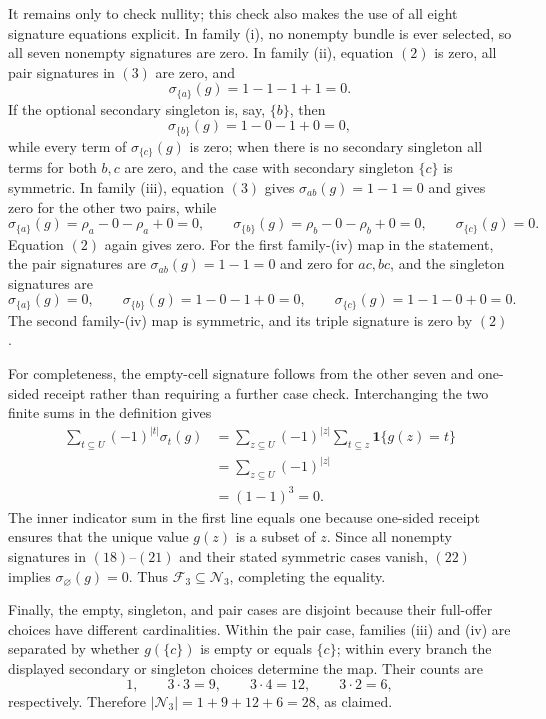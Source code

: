 It remains only to check nullity; this check also makes the use of all
eight signature equations explicit.  In family (i), no nonempty
bundle is ever selected, so all seven nonempty signatures are zero.
In family (ii), equation \((2)\) is zero, all pair signatures in
\((3)\) are zero, and
\[
\sigma_{\{a\}}(g)=1-1-1+1=0. \tag{18}
\]
If the optional secondary singleton is, say, \(\{b\}\), then
\[
\sigma_{\{b\}}(g)=1-0-1+0=0, \tag{19}
\]
while every term of \(\sigma_{\{c\}}(g)\) is zero; when there is no
secondary singleton all terms for both \(b,c\) are zero, and the
case with secondary singleton \(\{c\}\) is symmetric.  In family
(iii), equation \((3)\) gives
\(\sigma_{ab}(g)=1-1=0\) and gives zero for the other two pairs,
while
\[
\sigma_{\{a\}}(g)=\rho_a-0-\rho_a+0=0,
\qquad
\sigma_{\{b\}}(g)=\rho_b-0-\rho_b+0=0,
\qquad
\sigma_{\{c\}}(g)=0. \tag{20}
\]
Equation \((2)\) again gives zero.  For the first family-(iv) map in
the statement, the pair signatures are
\(\sigma_{ab}(g)=1-1=0\) and zero for \(ac,bc\), and the singleton
signatures are
\[
\sigma_{\{a\}}(g)=0,
\qquad
\sigma_{\{b\}}(g)=1-0-1+0=0,
\qquad
\sigma_{\{c\}}(g)=1-1-0+0=0. \tag{21}
\]
The second family-(iv) map is symmetric, and its triple signature is
zero by \((2)\).

For completeness, the empty-cell signature follows from the other
seven and one-sided receipt rather than requiring a further case
check.  Interchanging the two finite sums in the definition gives
\[
\begin{aligned}
\sum_{t\subseteq U}(-1)^{|t|}\sigma_t(g)
&=\sum_{z\subseteq U}(-1)^{|z|}
  \sum_{t\subseteq z}\mathbf 1\{g(z)=t\}\\
&=\sum_{z\subseteq U}(-1)^{|z|}\\
&=(1-1)^3=0.
\end{aligned} \tag{22}
\]
The inner indicator sum in the first line equals one because
one-sided receipt ensures that the unique value \(g(z)\) is a subset
of \(z\).  Since all nonempty signatures in
\((18)\)--\((21)\) and their stated symmetric cases vanish,
\((22)\) implies \(\sigma_\varnothing(g)=0\).  Thus
\(\mathcal F_3\subseteq\mathcal N_3\), completing the equality.

Finally, the empty, singleton, and pair cases are disjoint because
their full-offer choices have different cardinalities.  Within the
pair case, families (iii) and (iv) are separated by whether
\(g(\{c\})\) is empty or equals \(\{c\}\); within every branch the
displayed secondary or singleton choices determine the map.  Their counts are
\[
1,
\qquad
3\cdot3=9,
\qquad
3\cdot4=12,
\qquad
3\cdot2=6,
\]
respectively.  Therefore
\(|\mathcal N_3|=1+9+12+6=28\), as claimed.
